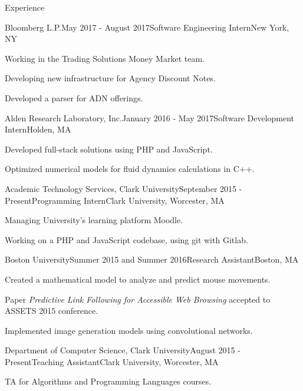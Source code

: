 \documentclass{resume} %
\begin{document}
\begin{rSection}{Experience}



\begin{rSubsection}{Bloomberg L.P.}{May 2017 - August 2017}{Software Engineering Intern}{New York, NY}
\item Working in the Trading Solutions Money Market team.
\item Developing new infrastructure for Agency Discount Notes.
\item Developed a parser for ADN offerings.
\end{rSubsection}

\begin{rSubsection}{Alden Research Laboratory, Inc.}{January 2016 - May 2017}{Software Development Intern}{Holden, MA}
\item Developed full-stack solutions using PHP and JavaScript.
\item Optimized numerical models for fluid dynamics calculations in C++.
\end{rSubsection}


\begin{rSubsection}{Academic Technology Services, Clark University}{September 2015 - Present}{Programming Intern}{Clark University, Worcester, MA}
\item Managing University's learning platform Moodle.
\item Working on a PHP and JavaScript codebase, using git with Gitlab.
\end{rSubsection}



\begin{rSubsection}{Boston University}{Summer 2015 and Summer 2016}{Research Assistant}{Boston, MA}
\item Created a mathematical model to analyze and predict mouse movements.
\item Paper \emph{Predictive Link Following for Accessible Web Browsing} accepted to ASSETS 2015 conference.
\item Implemented image generation models using convolutional networks.
\end{rSubsection}


\begin{rSubsection}{Department of Computer Science, Clark University}{August 2015 - Present}{Teaching Assistant}{Clark University, Worcester, MA}
\item TA for Algorithms and Programming Languages courses.
\end{rSubsection}


\end{rSection}
\end{document}
